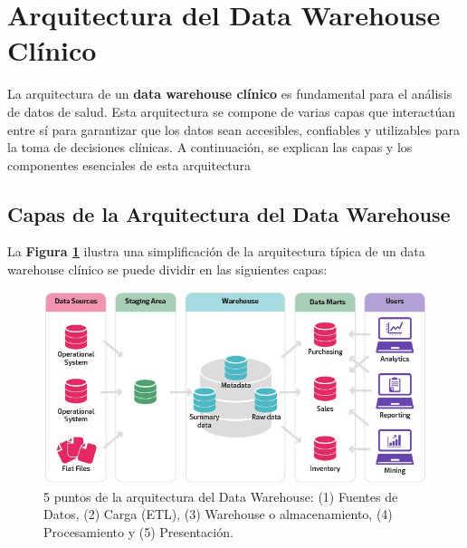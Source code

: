 \documentclass[12pt, a4paper, twoside]{article}
\begin{document}
	\section{Arquitectura del Data Warehouse Clínico}
	
	La arquitectura de un \textbf{data warehouse clínico} es fundamental para el análisis de datos de salud. Esta arquitectura se compone de varias capas que interactúan entre sí para garantizar que los datos sean accesibles, confiables y utilizables para la toma de decisiones clínicas. A continuación, se explican las capas y los componentes esenciales de esta arquitectura
	
	\subsection{Capas de la Arquitectura del Data Warehouse}

	La \textbf{Figura \ref{fig:Arqui}} ilustra una simplificación de la arquitectura típica de un data warehouse clínico se puede dividir en las siguientes capas:
	
	
	\begin{figure}[h!]
		\centering %
		\includegraphics[width=1\textwidth]{image/Arquitectura.jpg}
		\caption{5 puntos de la arquitectura del Data Warehouse: (1) Fuentes de Datos, (2) Carga (ETL), (3) Warehouse o almacenamiento, (4) Procesamiento y (5) Presentación.} %
		\label{fig:Arqui}
	\end{figure}
	
\end{document}
